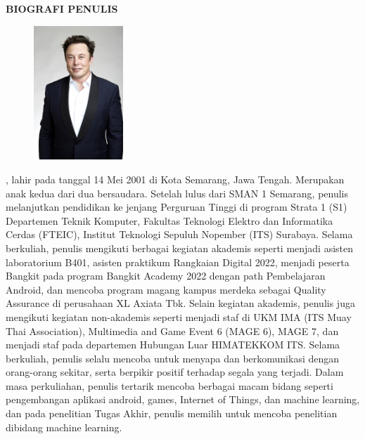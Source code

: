 \begin{center}
  \Large
  \textbf{BIOGRAFI PENULIS}
\end{center}


\vspace{2ex}

\begin{figure}
  \centering
  \vspace{-3ex}
  \includegraphics[width=0.3\textwidth]{gambar/elon.jpg}
  \vspace{-4ex}
\end{figure}

\name{}, lahir pada tanggal 14 Mei 2001 di Kota Semarang, Jawa Tengah. Merupakan anak kedua dari 
dua bersaudara. Setelah lulus dari SMAN 1 Semarang, penulis melanjutkan pendidikan ke jenjang 
Perguruan Tinggi di program Strata 1 (S1) Departemen Teknik Komputer, Fakultas Teknologi Elektro 
dan Informatika Cerdas (FTEIC), Institut Teknologi Sepuluh Nopember (ITS) Surabaya. Selama berkuliah, 
penulis mengikuti berbagai kegiatan akademis seperti menjadi asisten laboratorium B401, asisten 
praktikum Rangkaian Digital 2022, menjadi peserta Bangkit pada program Bangkit Academy 2022 dengan path 
Pembelajaran Android, dan mencoba program magang kampus merdeka sebagai Quality Assurance di perusahaan 
XL Axiata Tbk. Selain kegiatan akademis, penulis juga mengikuti kegiatan non-akademis seperti menjadi 
staf di UKM IMA (ITS Muay Thai Association), Multimedia and Game Event 6 (MAGE 6), MAGE 7, dan menjadi 
staf pada departemen Hubungan Luar HIMATEKKOM ITS. Selama berkuliah, penulis selalu mencoba untuk menyapa 
dan berkomunikasi dengan orang-orang sekitar, serta berpikir positif terhadap segala yang terjadi. Dalam 
masa perkuliahan, penulis tertarik mencoba berbagai macam bidang seperti pengembangan aplikasi android, 
games, Internet of Things, dan machine learning, dan pada penelitian Tugas Akhir, penulis memilih untuk 
mencoba penelitian dibidang machine learning.
